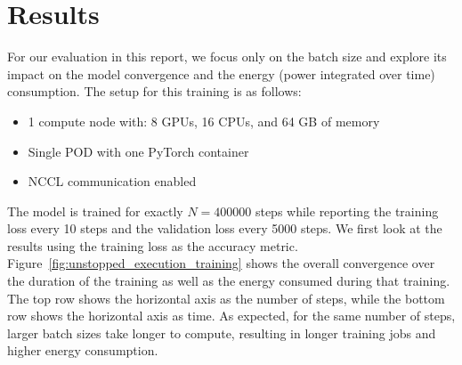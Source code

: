 \documentclass{article}
\begin{document}
    \section{Results}
    {
        For our evaluation in this report, we focus only on the batch size and explore its impact on the model convergence and the energy (power integrated over time) consumption. The setup for this training is as follows:

        \begin{itemize}
            \item 1 compute node with: 8 GPUs, 16 CPUs, and 64 GB of memory
            \item Single POD with one PyTorch container
            \item NCCL communication enabled
        \end{itemize}

        \noindent The model is trained for exactly $N = 400000$ steps while reporting the training loss every 10 steps and the validation loss every 5000 steps. We first look at the results using the training loss as the accuracy metric. Figure~\ref{fig:unstopped_execution_training} shows the overall convergence over the duration of the training as well as the energy consumed during that training. The top row shows the horizontal axis as the number of steps, while the bottom row shows the horizontal axis as time. As expected, for the same number of steps, larger batch sizes take longer to compute, resulting in longer training jobs and higher energy consumption.

}
\end{document}

